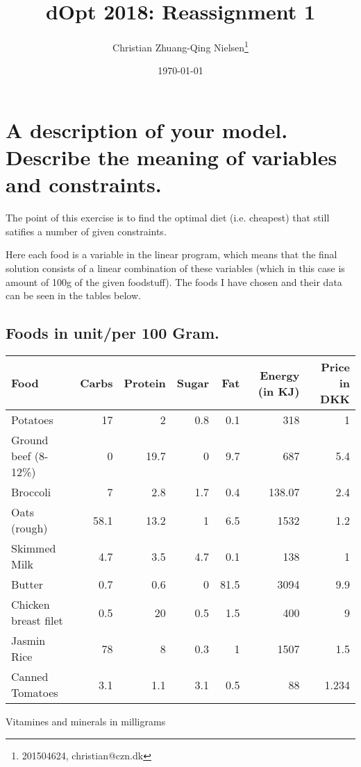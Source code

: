 \documentclass[margin=0.3in]{article}
\author{Christian Zhuang-Qing Nielsen\thanks{201504624, christian@czn.dk}}
\date{\today}
\title{dOpt 2018: Reassignment 1}
\begin{document}
\maketitle
\tableofcontents


\section{A description of your model. Describe the meaning of variables  and constraints.}
\label{sec-1}
The point of this exercise is to find the optimal diet (i.e. cheapest) that still satifies a number of given constraints.

Here each food is a variable in the linear program, which means that the final solution consists of a linear combination of these variables (which in this case is amount of 100g of the given foodstuff). The foods I have chosen and their data can be seen in the tables below.

\subsection{Foods in unit/per 100 Gram.}
\label{sec-1-1}

\begin{center}
\begin{tabular}{lrrrrrr}
\hline
\textbf{Food} & \textbf{Carbs} & \textbf{Protein} & \textbf{Sugar} & \textbf{Fat} & \textbf{Energy (in KJ)} & \textbf{Price in DKK}\\
\hline
Potatoes & 17 & 2 & 0.8 & 0.1 & 318 & 1\\
\hline
Ground beef (8-12\%) & 0 & 19.7 & 0 & 9.7 & 687 & 5.4\\
\hline
Broccoli & 7 & 2.8 & 1.7 & 0.4 & 138.07 & 2.4\\
\hline
Oats (rough) & 58.1 & 13.2 & 1 & 6.5 & 1532 & 1.2\\
\hline
Skimmed Milk & 4.7 & 3.5 & 4.7 & 0.1 & 138 & 1\\
\hline
Butter & 0.7 & 0.6 & 0 & 81.5 & 3094 & 9.9\\
\hline
Chicken breast filet & 0.5 & 20 & 0.5 & 1.5 & 400 & 9\\
\hline
Jasmin Rice & 78 & 8 & 0.3 & 1 & 1507 & 1.5\\
\hline
Canned Tomatoes & 3.1 & 1.1 & 3.1 & 0.5 & 88 & 1.234\\
\hline
\end{tabular}
\end{center}

Vitamines and minerals in milligrams
\end{document}

